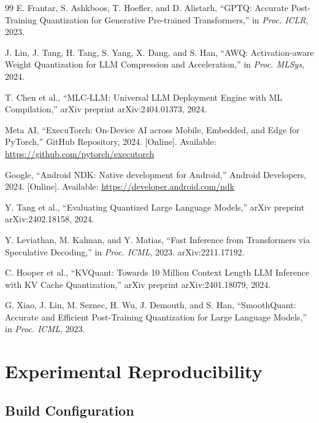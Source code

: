 \documentclass[conference]{IEEEtran}
\begin{document}
\begin{thebibliography}{99}
E. Frantar, S. Ashkboos, T. Hoefler, and D. Alistarh,
``GPTQ: Accurate Post-Training Quantization for Generative Pre-trained Transformers,''
in \textit{Proc. ICLR}, 2023.

J. Lin, J. Tang, H. Tang, S. Yang, X. Dang, and S. Han,
``AWQ: Activation-aware Weight Quantization for LLM Compression and Acceleration,''
in \textit{Proc. MLSys}, 2024.

T. Chen et al., ``MLC-LLM: Universal LLM Deployment Engine with ML Compilation,''
arXiv preprint arXiv:2404.01373, 2024.

Meta AI, ``ExecuTorch: On-Device AI across Mobile, Embedded, and Edge for PyTorch,''
GitHub Repository, 2024. [Online]. Available:
\url{https://github.com/pytorch/executorch}

Google, ``Android NDK: Native development for Android,''
Android Developers, 2024. [Online]. Available:
\url{https://developer.android.com/ndk}

Y. Tang et al.,
``Evaluating Quantized Large Language Models,''
arXiv preprint arXiv:2402.18158, 2024.

Y. Leviathan, M. Kalman, and Y. Matias,
``Fast Inference from Transformers via Speculative Decoding,''
in \textit{Proc. ICML}, 2023. arXiv:2211.17192.

C. Hooper et al.,
``KVQuant: Towards 10 Million Context Length LLM Inference with KV Cache Quantization,''
arXiv preprint arXiv:2401.18079, 2024.

G. Xiao, J. Lin, M. Seznec, H. Wu, J. Demouth, and S. Han,
``SmoothQuant: Accurate and Efficient Post-Training Quantization for Large Language Models,''
in \textit{Proc. ICML}, 2023.

\end{thebibliography}

\appendix

\section{Experimental Reproducibility}

\subsection{Build Configuration}
\end{document}
